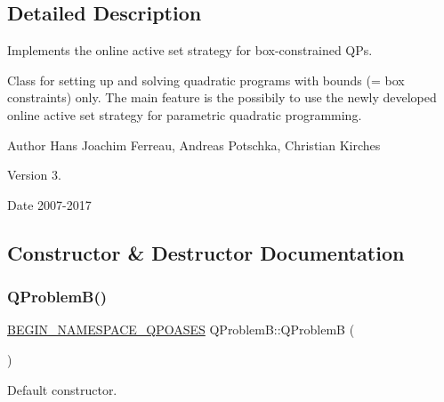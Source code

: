 \subsection{Detailed Description}
Implements the online active set strategy for box-\/constrained Q\+Ps. 

Class for setting up and solving quadratic programs with bounds (= box constraints) only. The main feature is the possibily to use the newly developed online active set strategy for parametric quadratic programming.

\begin{DoxyAuthor}{Author}
Hans Joachim Ferreau, Andreas Potschka, Christian Kirches 
\end{DoxyAuthor}
\begin{DoxyVersion}{Version}
3. 
\end{DoxyVersion}
\begin{DoxyDate}{Date}
2007-\/2017 
\end{DoxyDate}


\subsection{Constructor \& Destructor Documentation}
\mbox{\label{class_q_problem_b_a130f38af91d808933e0f89948a82d030}} 
\subsubsection{\texorpdfstring{Q\+Problem\+B()}{QProblemB()}\hspace{0.1cm}{\footnotesize\ttfamily [1/3]}}
{\footnotesize\ttfamily \hyperlink{_types_8hpp_afd127fcb3c8f47975e9fa0ec2bacde52}{B\+E\+G\+I\+N\+\_\+\+N\+A\+M\+E\+S\+P\+A\+C\+E\+\_\+\+Q\+P\+O\+A\+S\+ES} Q\+Problem\+B\+::\+Q\+ProblemB (\begin{DoxyParamCaption}{ }\end{DoxyParamCaption})}

Default constructor. \mbox{\label{class_q_problem_b_aea8e763194471ee707b3c61da23d8e62}} 
